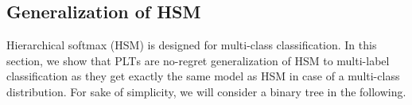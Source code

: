 \documentclass{article}
\newcommand{\Algo}[1]{\textsc{#1}}
\newcommand{\sectionBefore}{-0pt}
\newcommand{\sectionAfter}{-0pt}
\begin{document}
{\vspace{\sectionBefore}
\subsection{Generalization of HSM}
\label{sec:hsm}
\vspace{\sectionAfter}

Hierarchical softmax (\Algo{HSM}) is designed for multi-class classification. In this section, we show that \Algo{PLT}s are no-regret generalization of \Algo{HSM} to multi-label classification as they get exactly the same model as \Algo{HSM} in case of a multi-class distribution. 
For sake of simplicity, we will consider a binary tree in the following.  

}
\end{document}
